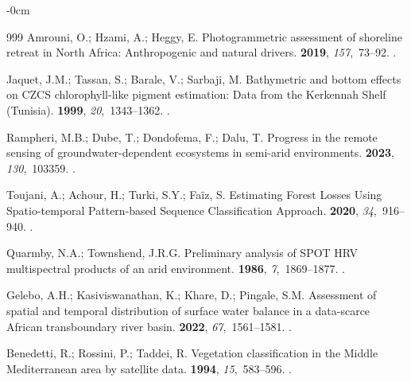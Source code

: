 \documentclass[land,article,accept,pdftex,moreauthors]{Definitions/mdpi}
\begin{document}
\begin{adjustwidth}{-\extralength}{0cm}
\begin{thebibliography}{999}
Amrouni, O.; Hzami, A.; Heggy, E.
\newblock Photogrammetric assessment of shoreline retreat in North Africa:
  Anthropogenic and natural drivers.
 {\bf 2019},
  {\em 157},~73--92.
.

Jaquet, J.M.; Tassan, S.; Barale, V.; Sarbaji, M.
\newblock Bathymetric and bottom effects on CZCS chlorophyll-like pigment
  estimation: Data from the Kerkennah Shelf (Tunisia).
 {\bf 1999}, {\em
  20},~1343--1362.
.

Rampheri, M.B.; Dube, T.; Dondofema, F.; Dalu, T.
\newblock Progress in the remote sensing of groundwater-dependent ecosystems in
  semi-arid environments.
 {\bf 2023},
  {\em 130},~103359.
.

Toujani, A.; Achour, H.; Turki, S.Y.; Faïz, S.
\newblock Estimating Forest Losses Using Spatio-temporal Pattern-based Sequence
  Classification Approach.
 {\bf 2020}, {\em 34},~916--940.
.

Quarmby, N.A.; Townshend, J.R.G.
\newblock Preliminary analysis of SPOT HRV multispectral products of an arid
  environment.
 {\bf 1986}, {\em
  7},~1869--1877.
.

Gelebo, A.H.; Kasiviswanathan, K.; Khare, D.; Pingale, S.M.
\newblock Assessment of spatial and temporal distribution of surface water
  balance in a data-scarce African transboundary river basin.
 {\bf 2022}, {\em 67},~1561--1581.
.

Benedetti, R.; Rossini, P.; Taddei, R.
\newblock Vegetation classification in the Middle Mediterranean area by
  satellite data.
 {\bf 1994}, {\em
  15},~583--596.
.


\end{thebibliography}
\end{adjustwidth}
\end{document}

